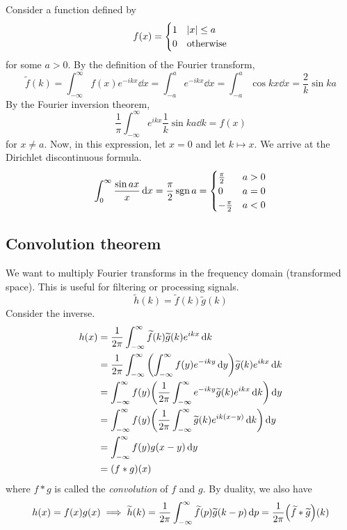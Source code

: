 \begin{example}
	Consider a function defined by
	\[
		f(x) = \begin{cases}
			1 & \abs{x} \leq a   \\
			0 & \text{otherwise}
		\end{cases}
	\]
	for some \( a > 0 \).
	By the definition of the Fourier transform,
	\[
		\widetilde f(k) = \int_{-\infty}^\infty f(x) e^{-ikx} \dd{x} = \int_{-a}^a e^{-ikx} \dd{x} = \int_{-a}^a \cos kx \dd{x} = \frac{2}{k} \sin ka
	\]
	By the Fourier inversion theorem,
	\[
		\frac{1}{\pi} \int_{-\infty}^\infty e^{ikx} \frac{1}{k} \sin ka \dd{k} = f(x)
	\]
	for \( x \neq a \).
	Now, in this expression, let \( x = 0 \) and let \( k \mapsto x \).
	We arrive at the Dirichlet discontinuous formula.
	\[
		\int_0^\infty \frac{\sin ax}{x} \dd{x} = \frac{\pi}{2} \operatorname{sgn} a = \begin{cases}
			\frac{\pi}{2}  & a > 0 \\
			0              & a = 0 \\
			-\frac{\pi}{2} & a < 0
		\end{cases}
	\]
\end{example}

\subsection{Convolution theorem}
We want to multiply Fourier transforms in the frequency domain (transformed space).
This is useful for filtering or processing signals.
\[
	\widetilde h(k) = \widetilde f(k) \widetilde g(k)
\]
Consider the inverse.
\begin{align*}
	h(x) & = \frac{1}{2\pi} \int_{-\infty}^\infty \widetilde f(k) \widetilde g(k) e^{ikx} \dd{k}                                    \\
	     & = \frac{1}{2\pi} \int_{-\infty}^\infty \qty(\int_{-\infty}^\infty f(y) e^{-iky} \dd{y}) \widetilde g(k) e^{ikx} \dd{k}   \\
	     & = \int_{-\infty}^\infty f(y) \qty( \frac{1}{2\pi} \int_{-\infty}^\infty e^{-iky} \widetilde g(k) e^{ikx} \dd{k} ) \dd{y} \\
	     & = \int_{-\infty}^\infty f(y) \qty( \frac{1}{2\pi} \int_{-\infty}^\infty \widetilde g(k) e^{ik(x-y)} \dd{k} ) \dd{y}      \\
	     & = \int_{-\infty}^\infty f(y) g(x-y) \dd{y}                                                                               \\
	     & = (f \ast g)(x)
\end{align*}
where \( f \ast g \) is called the \textit{convolution} of \( f \) and \( g \).
By duality, we also have
\[
	h(x) = f(x) g(x) \implies \widetilde h(k) = \frac{1}{2\pi} \int_{-\infty}^\infty \widetilde f(p) \widetilde g(k-p) \dd{p} = \frac{1}{2\pi}\qty(\widetilde f \ast \widetilde g)(k)
\]

